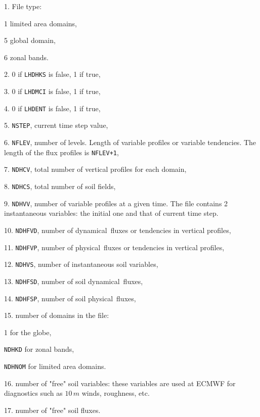 \begin{description}
        \item{1.} File type:
        \begin{description}
                \item{1} limited area domains,
                \item{5} global domain,
                \item{6} zonal bands.
        \end{description}
        \item{2.} 0 if {\tt LHDHKS} is false, 1 if true,
        \item{3.} 0 if {\tt LHDMCI} is false, 1 if true, 
        \item{4.} 0 if {\tt LHDENT} is false, 1 if true, 
        \item{5.} {\tt NSTEP}, current time step value, 
        \item{6.} {\tt NFLEV}, number of levels. Length of variable profiles or variable tendencies. The length of the flux profiles is {\tt NFLEV+1},
        \item{7.} {\tt NDHCV}, total number of vertical profiles for each domain,
        \item{8.} {\tt NDHCS}, total number of soil fields,
        \item{9.} {\tt NDHVV}, number of variable profiles at a given time. The file contains 2 instantaneous variables: the initial one and that of current time step.
        \item{10.} {\tt NDHFVD}, number of \og dynamical\fg\ fluxes or tendencies in vertical profiles, 
        \item{11.} {\tt NDHFVP}, number of \og physical\fg\ fluxes or tendencies in vertical profiles,
        \item{12.} {\tt NDHVS}, number of instantaneous soil variables, 
        \item{13.} {\tt NDHFSD}, number of soil \og dynamical\fg\ fluxes,
        \item{14.} {\tt NDHFSP}, number of soil \og physical\fg\ fluxes,
        \item{15.} number of domains in the file:
        \begin{description}
                \item{1} for the globe,
                \item{\tt NDHKD} for zonal bands,
                \item{\tt NDHNOM} for limited area domains.
        \end{description}
        \item{16.} number of "free" soil variables: these variables are used at ECMWF for diagnostics such as $10\,m$ winds, roughness, etc.
        \item{17.} number of "free" soil fluxes.
\end{description}
